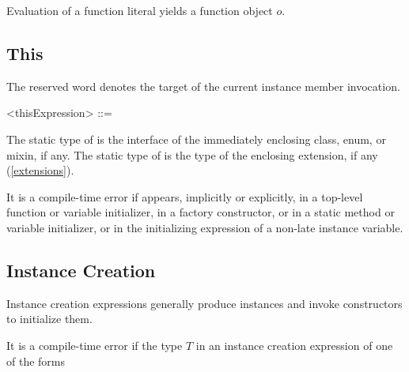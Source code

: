 \documentclass[makeidx]{article}
\begin{document}
{\LMHash{}%
Evaluation of a function literal yields a function object $o$.



\subsection{This}

\LMHash{}%
The reserved word \THIS{} denotes
the target of the current instance member invocation.

\begin{grammar}
<thisExpression> ::= \THIS{}
\end{grammar}

\LMHash{}%
The static type of \THIS{} is the interface of the
immediately enclosing class, enum, or mixin, if any.
The static type of \THIS{} is
the \ON{} type of the enclosing extension, if any
(\ref{extensions}).


\LMHash{}%
It is a compile-time error if \THIS{} appears, implicitly or explicitly,
in a top-level function or variable initializer, in a factory constructor,
or in a static method or variable initializer,
or in the initializing expression of a non-late instance variable.


\subsection{Instance Creation}

\LMHash{}%
Instance creation expressions generally produce instances
and invoke constructors to initialize them.


\LMHash{}%
It is a compile-time error if
the type $T$ in an instance creation expression of one of the forms

}
\end{document}
